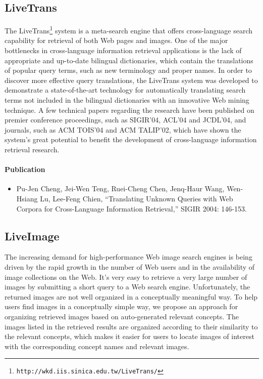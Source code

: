 \documentclass{article}[12pt]
\newcommand\url[1]{\texttt{#1}}
\begin{document}
\subsection{LiveTrans}

The LiveTrans\footnote{\url{http://wkd.iis.sinica.edu.tw/LiveTrans/}} system is
a meta-search engine that offers cross-language search capability for retrieval
of both Web pages and images.  One of the major bottlenecks in cross-language
information retrieval applications is the lack of appropriate and up-to-date
bilingual dictionaries, which contain the translations of popular query terms,
such as new terminology and proper names. In order to discover more effective
query translations, the LiveTrans system was developed to demonstrate a
state-of-the-art technology for automatically translating search terms not
included in the bilingual dictionaries with an innovative Web mining technique.
A few technical papers regarding the research have been published on premier
conference proceedings, such as SIGIR'04, ACL'04 and JCDL'04, and journals,
such as ACM TOIS'04 and ACM TALIP'02, which have shown the system's great
potential to benefit the development of cross-language information retrieval
research.

\paragraph{Publication}
\begin{itemize}
  \item Pu-Jen Cheng, Jei-Wen Teng, Ruei-Cheng Chen, Jenq-Haur
  Wang, Wen-Hsiang Lu, Lee-Feng Chien, ``Translating Unknown Queries with Web
  Corpora for Cross-Language Information Retrieval,'' SIGIR 2004: 146-153.
\end{itemize}

\subsection{LiveImage}

The increasing demand for high-performance Web image search engines is being
driven by the rapid growth in the number of Web users and in the availability
of image collections on the Web. It's very easy to retrieve a very large number
of images by submitting a short query to a Web search engine. Unfortunately,
the returned images are not well organized in a conceptually meaningful way. To
help users find images in a conceptually simple way, we propose an approach for
organizing retrieved images based on auto-generated relevant concepts. The
images listed in the retrieved results are organized according to their
similarity to the relevant concepts, which makes it easier for users to locate
images of interest with the corresponding concept names and relevant images.
\end{document}

